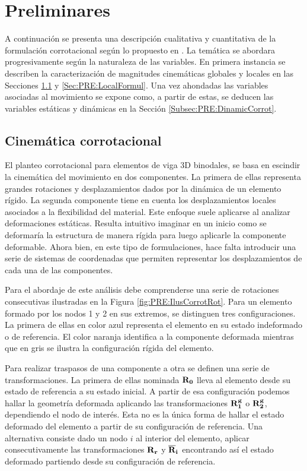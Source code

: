 \chapter{Preliminares}\label{Cap:Preliminares}
\linenumbers

A continuación se presenta una descripción cualitativa y cuantitativa de la formulación corrotacional según lo propuesto en \citep{Le2014}. La temática se abordara progresivamente según la naturaleza de las variables. En primera instancia se describen la caracterización de magnitudes cinemáticas globales y locales en las Secciones \ref{Subsec:PRE:CienmaticCorrot} y \ref{Sec:PRE:LocalFormul}. Una vez ahondadas las variables asociadas al movimiento se expone como, a partir de estas, se deducen las variables estáticas y dinámicas en la Sección \ref{Subsec:PRE:DinamicCorrot}.


\section{Cinemática corrotacional}\label{Subsec:PRE:CienmaticCorrot}

El planteo corrotacional para elementos de viga 3D binodales, se basa en escindir la cinemática del movimiento en dos componentes. La primera de ellas representa grandes rotaciones y desplazamientos dados por la dinámica de un elemento rígido. La segunda componente tiene en cuenta los desplazamientos locales asociados a la flexibilidad del material. Este enfoque suele aplicarse al analizar deformaciones estáticas. Resulta intuitivo imaginar en un inicio como se deformaría la estructura de manera rígida para luego aplicarle la componente deformable. Ahora bien, en este tipo de formulaciones, hace falta introducir una serie de sistemas de coordenadas que permiten representar los desplazamientos de cada una de las componentes.

Para el abordaje de este análisis debe comprenderse una serie de rotaciones consecutivas ilustradas en la Figura \ref{fig:PRE:IlusCorrotRot}. Para un elemento formado por los nodos 1 y 2 en sus extremos, se distinguen tres configuraciones. La primera de ellas en color azul representa el elemento en su estado indeformado o de referencia. El color naranja identifica a la componente deformada mientras que en gris se ilustra la configuración rígida del elemento. 

Para realizar traspasos de una componente a otra se definen una serie de transformaciones. La primera de ellas nominada $\bf{R}_0$ lleva al elemento desde su estado de referencia a su estado inicial. A partir de esa configuración podemos hallar la geometría deformada aplicando las transformaciones $\bf{R}_1^g$ o $\bf{R}_2^g$, dependiendo el nodo de interés. Esta no es la única forma de hallar el estado deformado del elemento a partir de su configuración de referencia. Una alternativa consiste dado un nodo $i$ al interior del elemento, aplicar consecutivamente las transformaciones $\bf{R}_r$ y $\bf{\overline{R}}_i$ encontrando así el estado deformado partiendo desde su configuración de referencia.  

